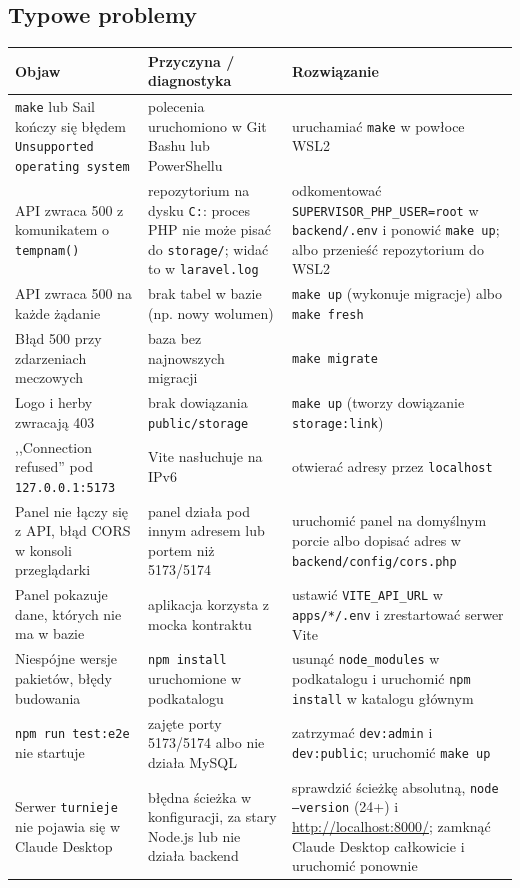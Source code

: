 \documentclass[11pt,a4paper,oneside]{article}
\newif\ifpodpowiedzi
\newcommand{\podpowiedz}[1]{\ifpodpowiedzi\par\begingroup\small\color{hintcolor}\textit{Wskazówka: #1}\par\endgroup\fi}
\begin{document}
\subsection{Typowe problemy}
\podpowiedz{Opisz rzeczywiście napotkane lub przewidywalne problemy instalacyjne i konfiguracyjne. Podaj objaw, sposób ustalenia przyczyny oraz działanie naprawcze. Wskaż logi lub polecenia diagnostyczne, jeśli pomagają. Dodaj wiersze według potrzeb.}
\begin{tabularx}{\textwidth}{@{}Y Y Y@{}}
\toprule
Objaw & Przyczyna / diagnostyka & Rozwiązanie\\
\midrule
\texttt{make} lub Sail kończy się błędem \texttt{Unsupported operating system} & polecenia uruchomiono w Git Bashu lub PowerShellu & uruchamiać \texttt{make} w powłoce WSL2\\
API zwraca 500 z komunikatem o \texttt{tempnam()} & repozytorium na dysku \texttt{C:}: proces PHP nie może pisać do \texttt{storage/}; widać to w \texttt{laravel.log} & odkomentować \texttt{SUPERVISOR\_PHP\_USER=root} w \texttt{backend/.env} i ponowić \texttt{make up}; albo przenieść repozytorium do WSL2\\
API zwraca 500 na każde żądanie & brak tabel w bazie (np. nowy wolumen) & \texttt{make up} (wykonuje migracje) albo \texttt{make fresh}\\
Błąd 500 przy zdarzeniach meczowych & baza bez najnowszych migracji & \texttt{make migrate}\\
Logo i herby zwracają 403 & brak dowiązania \texttt{public/storage} & \texttt{make up} (tworzy dowiązanie \texttt{storage:link})\\
,,Connection refused'' pod \texttt{127.0.0.1:5173} & Vite nasłuchuje na IPv6 & otwierać adresy przez \texttt{localhost}\\
Panel nie łączy się z API, błąd CORS w konsoli przeglądarki & panel działa pod innym adresem lub portem niż 5173/5174 & uruchomić panel na domyślnym porcie albo dopisać adres w \texttt{backend/config/cors.php}\\
Panel pokazuje dane, których nie ma w bazie & aplikacja korzysta z mocka kontraktu & ustawić \texttt{VITE\_API\_URL} w \texttt{apps/*/.env} i zrestartować serwer Vite\\
Niespójne wersje pakietów, błędy budowania & \texttt{npm install} uruchomione w podkatalogu & usunąć \texttt{node\_modules} w podkatalogu i uruchomić \texttt{npm install} w katalogu głównym\\
\texttt{npm run test:e2e} nie startuje & zajęte porty 5173/5174 albo nie działa MySQL & zatrzymać \texttt{dev:admin} i \texttt{dev:public}; uruchomić \texttt{make up}\\
Serwer \texttt{turnieje} nie pojawia się w Claude Desktop & błędna ścieżka w konfiguracji, za stary Node.js lub nie działa backend & sprawdzić ścieżkę absolutną, \texttt{node --version} (24+) i \url{http://localhost:8000/}; zamknąć Claude Desktop całkowicie i uruchomić ponownie\\
\bottomrule
\end{tabularx}
\end{document}
